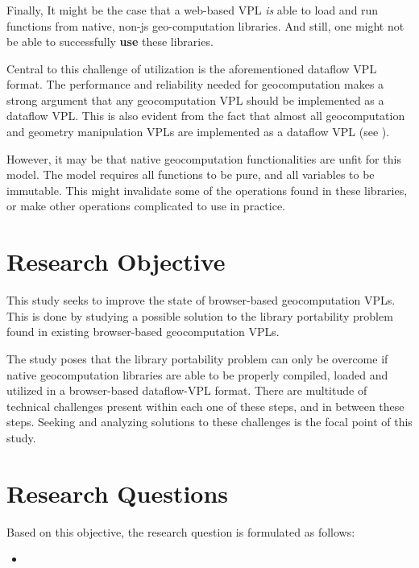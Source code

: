 \subsubsection*{\mySubRQFourTitle}

Finally, It might be the case that a web-based VPL \emph{is} able to load and run functions from native, non-js geo-computation libraries. 
And still, one might not be able to successfully \textbf{use} these libraries.

Central to this challenge of utilization is the aforementioned dataflow VPL format. 
The performance and reliability needed for geocomputation makes a strong argument that any geocomputation VPL should be implemented as a dataflow VPL. 
This is also evident from the fact that almost all geocomputation and geometry manipulation VPLs are implemented as a dataflow VPL (see ).

However, it may be that native geocomputation functionalities are unfit for this model. 
The model requires all functions to be pure, and all variables to be immutable. 
This might invalidate some of the operations found in these libraries, or make other operations complicated to use in practice.


\section{Research Objective}
This study seeks to improve the state of browser-based geocomputation VPLs.
This is done by studying a possible solution to the library portability problem found in existing browser-based geocomputation VPLs.

The study poses that the library portability problem can only be overcome if native geocomputation libraries are able to be properly compiled, loaded and utilized in a browser-based dataflow-VPL format. 
There are multitude of technical challenges present within each one of these steps, and in between these steps. 
Seeking and analyzing solutions to these challenges is the focal point of this study. 


\section{Research Questions}
Based on this objective, the research question is formulated as follows: 
\begin{itemize}[ ]
  \item \myMainRQ
\end{itemize}


